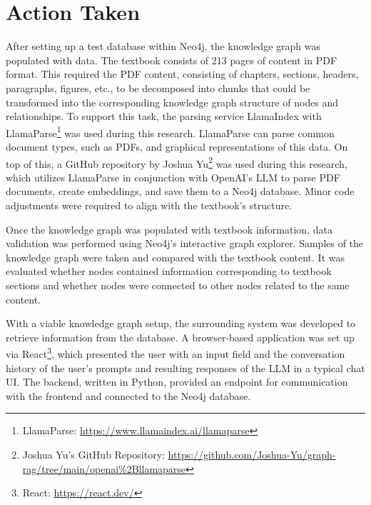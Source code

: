 \section{Action Taken}
\label{sec:cycle1_actionTaken}
After setting up a test database within Neo4j, the knowledge graph was populated with data. The textbook consists of 213 pages of content in PDF format. This required the PDF content, consisting of chapters, sections, headers, paragraphs, figures, etc., to be decomposed into chunks that could be transformed into the corresponding knowledge graph structure of nodes and relationships. To support this task, the parsing service LlamaIndex with LlamaParse\footnote{LlamaParse: \url{https://www.llamaindex.ai/llamaparse}} was used during this research. LlamaParse can parse common document types, such as PDFs, and graphical representations of this data. On top of this, a GitHub repository by Joshua Yu\footnote{Joshua Yu's GitHub Repository: \url{https://github.com/Joshua-Yu/graph-rag/tree/main/openai\%2Bllamaparse}} was used during this research, which utilizes LlamaParse in conjunction with OpenAI's LLM to parse PDF documents, create embeddings, and save them to a Neo4j database. Minor code adjustments were required to align with the textbook's structure.

Once the knowledge graph was populated with textbook information, data validation was performed using Neo4j's interactive graph explorer. Samples of the knowledge graph were taken and compared with the textbook content. It was evaluated whether nodes contained information corresponding to textbook sections and whether nodes were connected to other nodes related to the same content.

With a viable knowledge graph setup, the surrounding system was developed to retrieve information from the database. A browser-based application was set up via React\footnote{React: \url{https://react.dev/}}, which presented the user with an input field and the conversation history of the user's prompts and resulting responses of the LLM in a typical chat UI. The backend, written in Python, provided an endpoint for communication with the frontend and connected to the Neo4j database.

